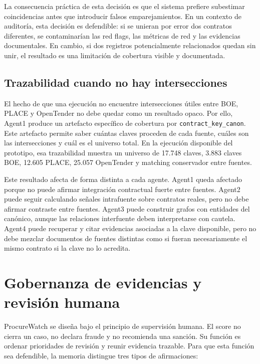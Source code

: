 \documentclass[11pt,a4paper,spanish]{book}
\numberwithin{equation}{chapter}
\numberwithin{figure}{chapter}
\begin{document}
La consecuencia pr{\'a}ctica de esta decisi{\'o}n es que el sistema prefiere subestimar coincidencias
antes que introducir falsos emparejamientos. En un contexto de auditor{\'i}a, esta decisi{\'o}n es
defendible: si se unieran por error dos contratos diferentes, se contaminar{\'i}an las red flags, las
m{\'e}tricas de red y las evidencias documentales. En cambio, si dos registros potencialmente
relacionados quedan sin unir, el resultado es una limitaci{\'o}n de cobertura visible y documentada.

\subsection{Trazabilidad cuando no hay intersecciones}

El hecho de que una ejecuci{\'o}n no encuentre intersecciones {\'u}tiles entre BOE, PLACE y OpenTender
no debe quedar como un resultado opaco. Por ello, Agent1 produce un artefacto espec{\'i}fico de
cobertura por \texttt{contract\_key\_canon}. Este artefacto permite saber cu{\'a}ntas claves proceden
de cada fuente, cu{\'a}les son las intersecciones y cu{\'a}l es el universo total. En la ejecuci{\'o}n
disponible del prototipo, esa trazabilidad muestra un universo de 17.748 claves, 3.883 claves BOE, 12.605 PLACE,
25.057 OpenTender y matching conservador entre fuentes.

Este resultado afecta de forma distinta a cada agente. Agent1 queda afectado porque no puede afirmar
integraci{\'o}n contractual fuerte entre fuentes. Agent2 puede seguir calculando se{\~n}ales intrafuente
sobre contratos reales, pero no debe afirmar contraste entre fuentes. Agent3 puede construir grafos
con entidades del can{\'o}nico, aunque las relaciones interfuente deben interpretarse con cautela.
Agent4 puede recuperar y citar evidencias asociadas a la clave disponible, pero no debe mezclar
documentos de fuentes distintas como si fueran necesariamente el mismo contrato si la clave no lo
acredita.

\section{Gobernanza de evidencias y revisi{\'o}n humana}
\label{sec:gobernanza_evidencias}

ProcureWatch se dise{\~n}a bajo el principio de supervisi{\'o}n humana. El score no cierra un caso, no
declara fraude y no recomienda una sanci{\'o}n. Su funci{\'o}n es ordenar prioridades de revisi{\'o}n y
reunir evidencia trazable. Para que esta funci{\'o}n sea defendible, la memoria distingue tres tipos
de afirmaciones:
\end{document}
